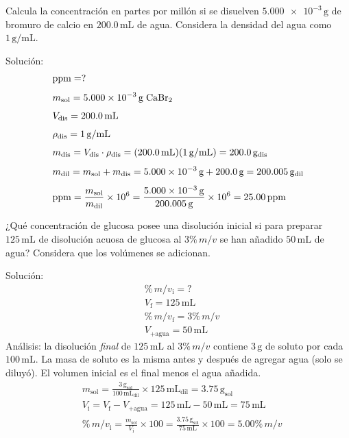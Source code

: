 \begin{exercise}{}{}
Calcula la concentración en partes por millón si se disuelven $\num{5.000e-3}\,\mathrm{g}$ de bromuro de calcio en $200.0\,\mathrm{mL}$ de agua. Considera la densidad del agua como $1\,\mathrm{g/mL}$.

Solución:
\begin{align*}
    &\mathrm{ppm} = ? \\[4pt]
    &m_{\mathrm{sol}} = \num{5.000e-3}\,\mathrm{g}\;\ce{CaBr2} \\[4pt]
    &V_{\mathrm{dis}} = 200.0\,\mathrm{mL} \\[4pt]
    &\rho_{\mathrm{dis}} = 1\,\mathrm{g/mL} \\[4pt]
    &m_{\mathrm{dis}} = V_{\mathrm{dis}} \cdot \rho_{\mathrm{dis}}
        = (200.0\,\mathrm{mL})(1\,\mathrm{g/mL})
        = 200.0\,\mathrm{g}_{\mathrm{dis}} \\[4pt]
    &m_{\mathrm{dil}} = m_{\mathrm{sol}} + m_{\mathrm{dis}}
        = \num{5.000e-3}\,\mathrm{g} + 200.0\,\mathrm{g}
        = 200.005\,\mathrm{g}_{\mathrm{dil}} \\[4pt]
    &\mathrm{ppm} = \frac{m_{\mathrm{sol}}}{m_{\mathrm{dil}}} \times 10^6
        = \frac{\num{5.000e-3}\,\mathrm{g}}{200.005\,\mathrm{g}} \times 10^6
        = 25.00\,\mathrm{ppm}
\end{align*}
\end{exercise}

\begin{exercise}{}{}
¿Qué concentración de glucosa posee una disolución inicial si para preparar $125\,\mathrm{mL}$ de disolución acuosa de glucosa al $3\%\,m/v$ se han añadido $50\,\mathrm{mL}$ de agua? Considera que los volúmenes se adicionan.

Solución:
\begin{align*}
    &\%\,m/v_{\mathrm{i}} = ? \\[4pt]
    &V_{\mathrm{f}} = 125\,\mathrm{mL} \\[4pt]
    &\%\,m/v_{\mathrm{f}} = 3\%\,m/v \\[4pt]
    &V_{\mathrm{+agua}} = 50\,\mathrm{mL}
\end{align*}
Análisis: la disolución \textit{final} de $125\,\mathrm{mL}$ al $3\%\,m/v$ contiene $3\,\mathrm{g}$ de soluto por cada $100\,\mathrm{mL}$. La masa de soluto es la misma antes y después de agregar agua (solo se diluyó). El volumen inicial es el final menos el agua añadida.
\begin{align*}
    &m_{\mathrm{sol}} = \frac{3\,\mathrm{g}_{\mathrm{sol}}}{100\,\mathrm{mL}_{\mathrm{dil}}} \times 125\,\mathrm{mL}_{\mathrm{dil}} = 3.75\,\mathrm{g}_{\mathrm{sol}} \\[4pt]
    &V_{\mathrm{i}} = V_{\mathrm{f}} - V_{\mathrm{+agua}} = 125\,\mathrm{mL} - 50\,\mathrm{mL} = 75\,\mathrm{mL} \\[4pt]
    &\%\,m/v_{\mathrm{i}} = \frac{m_{\mathrm{sol}}}{V_{\mathrm{i}}} \times 100
        = \frac{3.75\,\mathrm{g}_{\mathrm{sol}}}{75\,\mathrm{mL}} \times 100
        = 5.00\%\,m/v
\end{align*}
\end{exercise}

